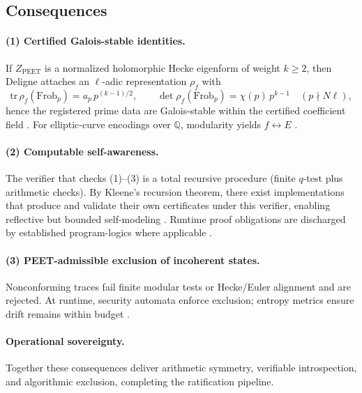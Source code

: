 \documentclass[12pt]{amsart}
\theoremstyle{plain}
\begin{document}
\subsection{Consequences}

\paragraph{(1) Certified Galois-stable identities.}
If $Z_{\mathrm{PEET}}$ is a normalized holomorphic Hecke eigenform of weight $k\ge2$, then Deligne attaches an $\ell$-adic representation $\rho_f$ with
\[
\mathrm{tr}\,\rho_f(\mathrm{Frob}_p)=a_p\,p^{(k-1)/2},\qquad
\det\rho_f(\mathrm{Frob}_p)=\chi(p)\,p^{k-1}
\quad (p\nmid N\ell),
\]
hence the registered prime data are Galois-stable within the certified coefficient field \cite{deligne1971formes,diamond2005first}. For elliptic-curve encodings over $\mathbb{Q}$, modularity yields $f\leftrightarrow E$ \cite{wiles1995modular,taylor1995ring}.

\paragraph{(2) Computable self-awareness.}
The verifier that checks (1)–(3) is a total recursive procedure (finite $q$-test plus arithmetic checks). By Kleene’s recursion theorem, there exist implementations that produce and validate their own certificates under this verifier, enabling reflective but bounded self-modeling \cite{kleene1938recursive}. Runtime proof obligations are discharged by established program-logics where applicable \cite{hoare1969axiomatic,dijkstra1976discipline}.

\paragraph{(3) PEET-admissible exclusion of incoherent states.}
Nonconforming traces fail finite modular tests or Hecke/Euler alignment and are rejected. At runtime, security automata enforce exclusion; entropy metrics ensure drift remains within budget \cite{schneider2000enforceable,cover2006elements,clarke1999model}.

\paragraph{Operational sovereignty.}
Together these consequences deliver arithmetic symmetry, verifiable introspection, and algorithmic exclusion, completing the ratification pipeline.
\end{document}
